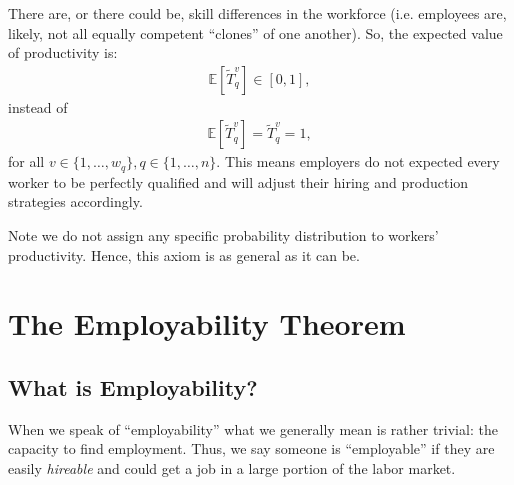 \documentclass[hidelinks, nonatbib]{elsarticle}
\begin{document}
\begin{axiom}
    There are, or there could be, skill differences in the workforce (i.e. employees are, likely, not all equally competent ``clones'' of one another). So, the expected value of productivity is:
    \begin{gather}
        \mathbb{E}[
            \tilde{T}_{q}^{v}
        ]
        \in
        [0,1]
        ,
    \end{gather}
    instead of 
    \begin{gather}
        \mathbb{E}[
            \tilde{T}_{q}^{v}
        ]
        =
        \tilde{T}_{q}^{v}
        = 1
        ,
    \end{gather}
    for all $v \in \{1, \dots, w_q\}, q \in \{1, \dots, n\}$. This means employers do not expected every worker to be perfectly qualified and will adjust their hiring and production strategies accordingly.
    
    Note we do not assign any specific probability distribution to workers' productivity. Hence, this axiom is as general as it can be.
\end{axiom}


\section{The Employability Theorem}
\subsection{What is Employability?}
When we speak of ``employability'' what we generally mean is rather trivial: the capacity to find employment. Thus, we say someone is ``employable'' if they are easily \textit{hireable} and could get a job in a large portion of the labor market.
\end{document}
